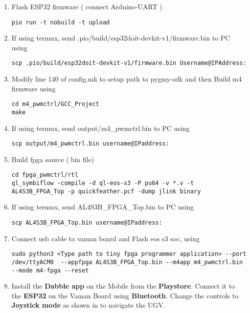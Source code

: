 \begin{enumerate}[label=\thesection.\arabic*.,ref=\thesection.\theenumi]
\item Flash ESP32 firmware ( connect Arduino-UART  )
\begin{lstlisting}
pio run -t nobuild -t upload
\end{lstlisting} 

\item If using termux, send .pio/build/esp32doit-devkit-v1/firmware.bin to PC using
\begin{lstlisting}
scp .pio/build/esp32doit-devkit-v1/firmware.bin Username@IPAddress:
\end{lstlisting} 

\item  Modify line 140 of config.mk to setup path to pygmy-sdk and then Build m4 firmware using
\begin{lstlisting}
cd m4_pwmctrl/GCC_Project
make
\end{lstlisting}

\item If using termux, send output/m4{\_}pwmctrl.bin to PC using
\begin{lstlisting}
scp output/m4_pwmctrl.bin username@IPaddress:
\end{lstlisting} 

\item Build fpga source (.bin file)
\begin{lstlisting}
cd fpga_pwmctrl/rtl
ql_symbiflow -compile -d ql-eos-s3 -P pu64 -v *.v -t AL4S3B_FPGA_Top -p quickfeather.pcf -dump jlink binary 
\end{lstlisting} 

\item If using termux, send AL4S3B{\_}FPGA{\_}Top.bin to PC using
\begin{lstlisting}
scp AL4S3B_FPGA_Top.bin username@IPaddress:
\end{lstlisting} 

\item Connect usb cable to vaman board and Flash eos s3 soc, using
\begin{lstlisting}
sudo python3 <Type path to tiny fpga programmer application> --port /dev/ttyACM0  --appfpga AL4S3B_FPGA_Top.bin --m4app m4_pwmctrl.bin --mode m4-fpga --reset
\end{lstlisting} 

\item Install the \textbf{Dabble app} on the Mobile from the \textbf{Playstore}. Connect it to the \textbf{ESP32} on the Vaman Board using \textbf{Bluetooth}. Change the controls to \textbf{Joystick mode} as shown in to navigate the UGV.\\

\end{enumerate}
